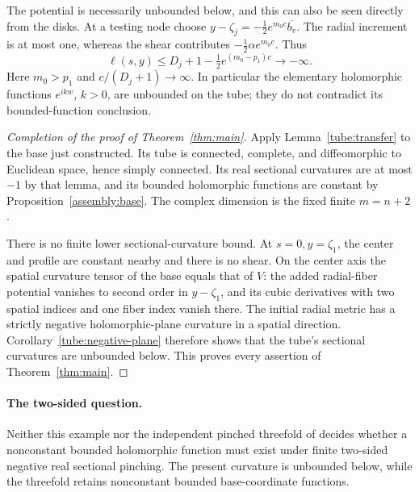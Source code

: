 \begin{remark}\label{assembly:potential-unbounded}
The potential is necessarily unbounded below, and this can also be
seen directly from the disks. At a testing node choose
$y-\zeta_j=-\tfrac12 e^{m_0c}\overline{b_v}$.
The radial increment is at most one, whereas the shear contributes
$-\tfrac12\alpha e^{m_0c}$. Thus
\[
 \ell(s,y)\leq D_j+1-\tfrac12e^{(m_0-p_1)c}\longrightarrow-\infty.
\]
Here $m_0>p_1$ and $c/(D_j+1)\to\infty$.
In particular the elementary holomorphic functions $e^{ikw}$,
$k>0$, are unbounded on the tube; they do not contradict its
bounded-function conclusion.
\end{remark}

\begin{proof}[Completion of the proof of Theorem~\ref{thm:main}]
Apply Lemma~\ref{tube:transfer} to the base just
constructed. Its tube is connected, complete, and
diffeomorphic to Euclidean space, hence simply connected.
Its real sectional curvatures are at most $-1$ by that lemma,
and its bounded holomorphic functions are constant by
Proposition~\ref{assembly:base}. The complex dimension is the fixed finite
$m=n+2$.

There is no finite lower sectional-curvature bound.
At $s=0,y=\zeta_1$, the center and profile are constant
nearby and there is no shear. On the center axis the
spatial curvature tensor of the base equals that of $V$:
the added radial-fiber potential vanishes to second
order in $y-\zeta_1$, and its cubic derivatives with two
spatial indices and one fiber index vanish there.
The initial radial metric has a strictly negative
holomorphic-plane curvature in a spatial direction.
Corollary~\ref{tube:negative-plane} therefore shows that the tube's
sectional curvatures are unbounded below.
This proves every assertion of Theorem~\ref{thm:main}.
\end{proof}


\paragraph{The two-sided question.}
Neither this example nor the independent pinched threefold of
\citet[Theorem~1.1]{OpenAIPinchedThreefold2026} decides whether a
nonconstant bounded holomorphic function must exist under finite
two-sided negative real sectional pinching. The present curvature is
unbounded below, while the threefold retains nonconstant bounded
base-coordinate functions.
